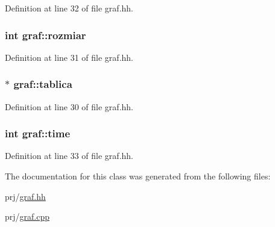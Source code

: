 \-Definition at line 32 of file graf.\-hh.

\hypertarget{classgraf_a596da8a77b680d7ec408b1253c2c43c3}{
\subsubsection[{rozmiar}]{\setlength{\rightskip}{0pt plus 5cm}int {\bf graf\-::rozmiar}}}\label{classgraf_a596da8a77b680d7ec408b1253c2c43c3}


\-Definition at line 31 of file graf.\-hh.

\hypertarget{classgraf_a028d547c797438718da6241a28b32db5}{
\subsubsection[{tablica}]{$\ast$ {\bf graf\-::tablica}}}\label{classgraf_a028d547c797438718da6241a28b32db5}


\-Definition at line 30 of file graf.\-hh.

\hypertarget{classgraf_a9202cb6ab351f5bbdbb79de440ab1fb5}{
\subsubsection[{time}]{\setlength{\rightskip}{0pt plus 5cm}int {\bf graf\-::time}}}\label{classgraf_a9202cb6ab351f5bbdbb79de440ab1fb5}


\-Definition at line 33 of file graf.\-hh.



\-The documentation for this class was generated from the following files\-:\begin{DoxyCompactItemize}
\item 
prj/\hyperlink{graf_8hh}{graf.\-hh}\item 
prj/\hyperlink{graf_8cpp}{graf.\-cpp}\end{DoxyCompactItemize}
